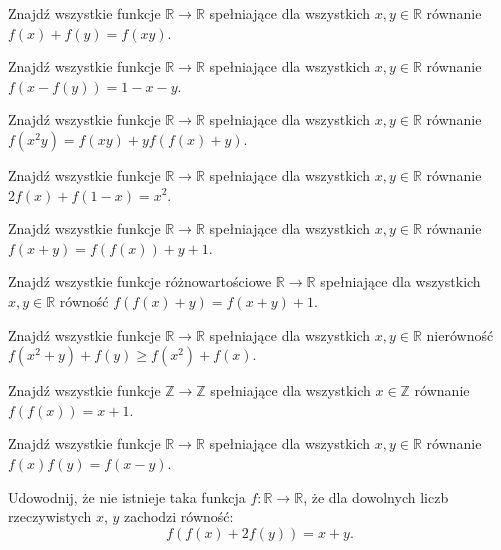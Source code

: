 \begin{problem}{1} 
	Znajdź wszystkie funkcje $\mathbb{R} \rightarrow \mathbb{R} $ spełniające dla wszystkich $x, y \in \mathbb{R} $ równanie $f(x)+f(y) = f(xy) $.
\end{problem}

\begin{problem}{2}
	Znajdź wszystkie funkcje $\mathbb{R} \rightarrow \mathbb{R} $ spełniające dla wszystkich $x, y \in \mathbb{R} $ równanie $f(x-f(y)) = 1 - x - y$.
\end{problem}

\begin{problem}{3}
	Znajdź wszystkie funkcje $\mathbb{R} \rightarrow \mathbb{R} $ spełniające dla wszystkich $x, y \in \mathbb{R} $ równanie $f(x^{2}y) = f(xy) + yf(f(x) +y) $.
\end{problem}

\begin{problem}{4}
	Znajdź wszystkie funkcje $\mathbb{R} \rightarrow \mathbb{R} $ spełniające dla wszystkich $x, y \in \mathbb{R} $ równanie $2f(x)+f(1-x)=x^{2} $. 
\end{problem}

\begin{problem}{5}
	Znajdź wszystkie funkcje $\mathbb{R} \rightarrow \mathbb{R} $ spełniające dla wszystkich $x, y \in \mathbb{R} $ równanie $f(x+y) = f(f(x)) + y + 1$. 
\end{problem}

\begin{problem}{6}
	Znajdź wszystkie funkcje różnowartościowe
	$\mathbb{R} \rightarrow \mathbb{R} $ spełniające dla wszystkich $x, y \in \mathbb{R} $ równość $f(f(x) + y)  = f(x+y) + 1$.
\end{problem}

\begin{problem}{7}
	Znajdź wszystkie funkcje 
	$\mathbb{R} \rightarrow \mathbb{R} $ spełniające dla wszystkich $x, y \in \mathbb{R} $ nierówność $f(x^2+y) + f(y) \geqslant f(x^2) + f(x) $. 
\end{problem}

\begin{problem}{8}
	Znajdź wszystkie funkcje $\mathbb{Z} \rightarrow \mathbb{Z} $ spełniające dla wszystkich $x \in \mathbb{Z} $ równanie $f(f(x)) =x+1$. 
\end{problem}

\begin{problem}{9}
	Znajdź wszystkie funkcje $\mathbb{R} \rightarrow \mathbb{R} $ spełniające dla wszystkich $x, y \in \mathbb{R} $ równanie $f(x) f(y) = f(x-y) $. 
\end{problem}

\begin{problem}{10}
	Udowodnij, że nie istnieje taka funkcja $f:\mathbb{R}\longrightarrow\mathbb{R}$, że dla dowolnych liczb rzeczywistych $x$, $y$ zachodzi równość:
	\[
	f(f(x)+2f(y))=x+y.
	\]
\end{problem}

